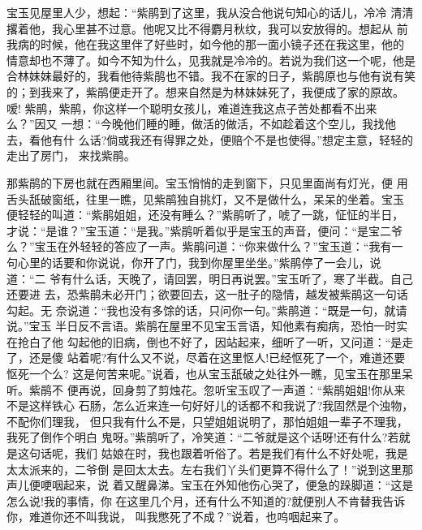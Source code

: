 宝玉见屋里人少，想起：“紫鹃到了这里，我从没合他说句知心的话儿，冷冷
清清撂着他，我心里甚不过意。他呢又比不得麝月秋纹，我可以安放得的。想起从
前我病的时候，他在我这里伴了好些时，如今他的那一面小镜子还在我这里，他的
情意却也不薄了。如今不知为什么，见我就是冷冷的。若说为我们这一个呢，他是
合林妹妹最好的，我看他待紫鹃也不错。我不在家的日子，紫鹃原也与他有说有笑
的；到我来了，紫鹃便走开了。想来自然是为林妹妹死了，我便成了家的原故。嗳!
紫鹃，紫鹃，你这样一个聪明女孩儿，难道连我这点子苦处都看不出来么？”因又
一想：“今晚他们睡的睡，做活的做活，不如趁着这个空儿，我找他去，看他有什
么话?倘或我还有得罪之处，便赔个不是也使得。”想定主意，轻轻的走出了房门，
来找紫鹃。

那紫鹃的下房也就在西厢里间。宝玉悄悄的走到窗下，只见里面尚有灯光，便
用舌头舐破窗纸，往里一瞧，见紫鹃独自挑灯，又不是做什么，呆呆的坐着。宝玉
便轻轻的叫道：“紫鹃姐姐，还没有睡么？”紫鹃听了，唬了一跳，怔怔的半日，
才说：“是谁？”宝玉道：“是我。”紫鹃听着似乎是宝玉的声音，便问：“是宝二爷
么？”宝玉在外轻轻的答应了一声。紫鹃问道：“你来做什么？”宝玉道：“我有一
句心里的话要和你说说，你开了门，我到你屋里坐坐。”紫鹃停了一会儿，说道：“二
爷有什么话，天晚了，请回罢，明日再说罢。”宝玉听了，寒了半截。自己还要进
去，恐紫鹃未必开门；欲要回去，这一肚子的隐情，越发被紫鹃这一句话勾起。无
奈说道：“我也没有多馀的话，只问你一句。”紫鹃道：“既是一句，就请说。”宝玉
半日反不言语。紫鹃在屋里不见宝玉言语，知他素有痴病，恐怕一时实在抢白了他
勾起他的旧病，倒也不好了，因站起来，细听了一听，又问道：“是走了，还是傻
站着呢?有什么又不说，尽着在这里怄人!已经怄死了一个，难道还要怄死一个么?
这是何苦来呢。”说着，也从宝玉舐破之处往外一瞧，见宝玉在那里呆听。紫鹃不
便再说，回身剪了剪烛花。忽听宝玉叹了一声道：“紫鹃姐姐!你从来不是这样铁心
石肠，怎么近来连一句好好儿的话都不和我说了?我固然是个浊物，不配你们理我，
但只我有什么不是，只望姐姐说明了，那怕姐姐一辈子不理我，我死了倒作个明白
鬼呀。”紫鹃听了，冷笑道：“二爷就是这个话呀!还有什么?若就是这句话呢，我们
姑娘在时，我也跟着听俗了。若是我们有什么不好处呢，我是太太派来的，二爷倒
是回太太去。左右我们丫头们更算不得什么了！”说到这里那声儿便哽咽起来，说
着又醒鼻涕。宝玉在外知他伤心哭了，便急的跺脚道：“这是怎么说!我的事情，你
在这里几个月，还有什么不知道的?就便别人不肯替我告诉你，难道你还不叫我说，
叫我憋死了不成？”说着，也呜咽起来了。

